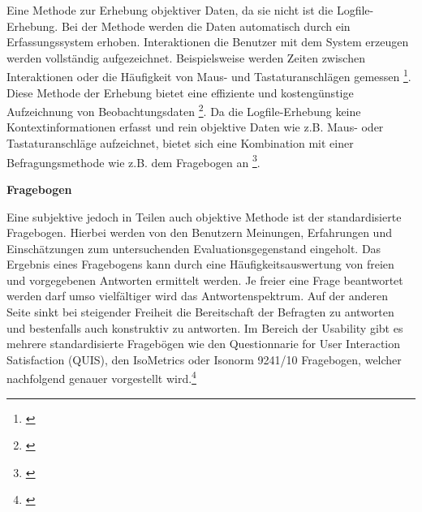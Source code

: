 Eine Methode zur Erhebung objektiver Daten, da sie nicht ist die Logfile-Erhebung. Bei der Methode werden die Daten automatisch durch ein Erfassungssystem erhoben. Interaktionen die Benutzer mit dem System erzeugen werden vollständig aufgezeichnet. Beispielsweise werden Zeiten zwischen Interaktionen oder die Häufigkeit von Maus- und Tastaturanschlägen gemessen \footnote{\cite[vgl.][63]{Hegner2003}}. Diese Methode der Erhebung bietet eine effiziente und kostengünstige Aufzeichnung von Beobachtungsdaten \footnote{\cite[vgl.][Kap. 65.3]{Baur2014}}. Da die Logfile-Erhebung keine Kontextinformationen erfasst und rein objektive Daten wie z.B. Maus- oder Tastaturanschläge aufzeichnet, bietet sich eine Kombination mit einer Befragungsmethode wie z.B. dem Fragebogen an \footnote{\cite[vgl.][17\psq]{Hegner2003}}.

\textbf{Fragebogen}

Eine subjektive jedoch in Teilen auch objektive Methode ist der standardisierte Fragebogen. Hierbei werden von den Benutzern Meinungen, Erfahrungen und Einschätzungen zum untersuchenden Evaluationsgegenstand eingeholt. Das Ergebnis eines Fragebogens kann durch eine Häufigkeitsauswertung von freien und vorgegebenen Antworten ermittelt werden. Je freier eine Frage beantwortet werden darf umso vielfältiger wird das Antwortenspektrum. Auf der anderen Seite sinkt bei steigender Freiheit die Bereitschaft der Befragten zu antworten und bestenfalls auch konstruktiv zu antworten. Im Bereich der Usability gibt es mehrere standardisierte Fragebögen wie den Questionnarie for User Interaction Satisfaction (QUIS), den IsoMetrics oder Isonorm 9241/10 Fragebogen, welcher nachfolgend genauer vorgestellt wird.\footnote{\cite[vgl.][Kap. 4.5.1.1]{Hegner2003}}

